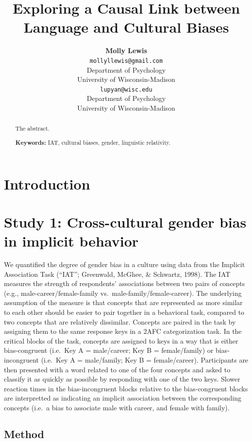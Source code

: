 \documentclass[10pt, letterpaper]{article}
\title{Exploring a Causal Link between Language and Cultural Biases}
\author{{\large \bf Molly Lewis} \\ \texttt{mollyllewis@gmail.com} \\ Department of Psychology  \\ University of Wisconsin-Madison \And {\large \bf Gary Lupyan} \\ \texttt{lupyan@wisc.edu} \\ Department of Psychology  \\ University of Wisconsin-Madison}
\begin{document}
\maketitle

\begin{abstract}
The abstract.

\textbf{Keywords:}
IAT, cultural biases, gender, linguistic relativity.
\end{abstract}

\section{Introduction}\label{introduction}

\section{Study 1: Cross-cultural gender bias in implicit
behavior}\label{study-1-cross-cultural-gender-bias-in-implicit-behavior}

We quantified the degree of gender bias in a culture using data from the
Implicit Association Task (``IAT''; Greenwald, McGhee, \& Schwartz,
1998). The IAT measures the strength of respondents' associations
between two pairs of concepts (e.g., male-career/female-family
vs.~male-family/female-career). The underlying assumption of the measure
is that concepts that are represented as more similar to each other
should be easier to pair together in a behavioral task, compared to two
concepts that are relatively dissimilar. Concepts are paired in the task
by assigning them to the same response keys in a 2AFC categorization
task. In the critical blocks of the task, concepts are assigned to keys
in a way that is either bias-congruent (i.e.~Key A = male/career; Key B
= female/family) or bias-incongruent (i.e.~Key A = male/family; Key B =
female/career). Participants are then presented with a word related to
one of the four concepts and asked to classify it as quickly as possible
by responding with one of the two keys. Slower reaction times in the
bias-incongruent blocks relative to the bias-congruent blocks are
interpretted as indicating an implicit association between the
corresponding concepts (i.e.~a bias to associate male with career, and
female with family).

\subsection{Method}\label{method}
\end{document}

